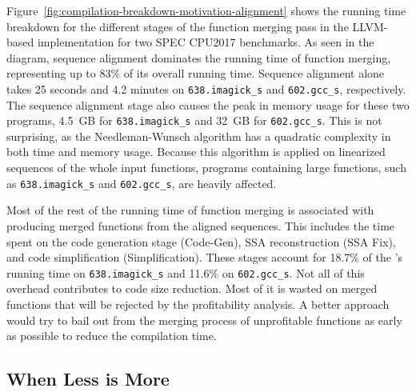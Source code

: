 Figure~\ref{fig:compilation-breakdown-motivation-alignment} shows the running time breakdown for the different stages of the function merging pass in the LLVM-based \SOAName  implementation for two SPEC CPU2017 benchmarks. 
As seen in the diagram, sequence alignment dominates the running time of function merging, representing up to 83\% of its overall running time. 
Sequence alignment alone takes 25 seconds and 4.2 minutes on \texttt{638.imagick\_s} and \texttt{602.gcc\_s}, respectively.
The sequence alignment stage also causes the peak in memory usage for these two programs, 4.5~GB for \texttt{638.imagick\_s} and 32~GB for \texttt{602.gcc\_s}.
This is not surprising, as the Needleman-Wunsch algorithm has a quadratic complexity in both time and memory usage.
Because this algorithm is applied on linearized sequences of the whole input functions, programs containing large functions, such as \texttt{638.imagick\_s} and \texttt{602.gcc\_s}, are heavily affected.

Most of the rest of the running time of function merging is associated with producing merged functions from the aligned sequences.  This includes the time spent on the code generation stage (Code-Gen), SSA reconstruction (SSA Fix), and code simplification (Simplification). These stages account for 18.7\% of the \SOAName’s running time on \texttt{638.imagick\_s} and 11.6\% on \texttt{602.gcc\_s}. Not all of this overhead contributes to code size reduction. Most of it is wasted on merged functions that will be rejected by the profitability analysis. 
A better approach would try to bail out from the merging process of unprofitable functions as early as possible to reduce the compilation time. 

\subsection{When Less is More}

